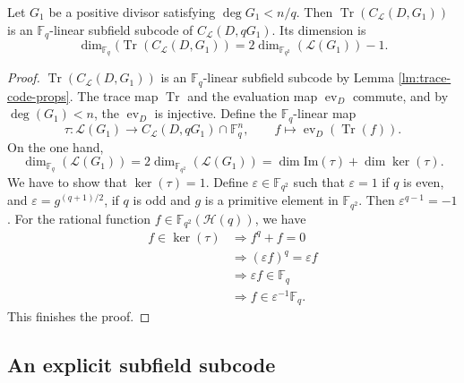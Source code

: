 \documentclass[entropy,article,submit,pdftex,moreauthors]{Definitions/mdpi}
\DeclareMathOperator{\ev}{ev}
\DeclareMathOperator{\trace}{Tr}
\begin{document}
\begin{Proposition} \label{pr:trace-subcode}
	Let $G_1$ be a positive divisor satisfying $\deg G_1 < n/q$. Then $\trace (C_{\mathcal{L}}(D,G_1))$ is an $\mathbb{F}_q$-linear subfield subcode of $C_{\mathcal{L}}(D,qG_1)$. Its dimension is
	\[ \dim_{\mathbb{F}_q}(\trace (C_{\mathcal{L}}(D,G_1)) = 2\dim_{\mathbb{F}_{q^2}}(\mathscr{L}(G_1))-1. \]
\end{Proposition}
\begin{proof}
$\trace (C_{\mathcal{L}}(D,G_1))$ is an $\mathbb{F}_q$-linear subfield subcode by Lemma \ref{lm:trace-code-props}. The trace map $\trace$ and the evaluation map $\ev_D$ commute, and by $\deg(G_1)<n$, the $\ev_D$ is injective. Define the $\mathbb{F}_q$-linear map
\[\tau:\mathscr{L}(G_1) \to C_{\mathcal{L}}(D,qG_1) \cap  \mathbb{F}_q^n, \qquad f\mapsto \ev_D(\trace(f)).\]
On the one hand,
\[\dim_{\mathbb{F}_q}(\mathscr{L}(G_1)) = 2\dim_{\mathbb{F}_{q^2}}(\mathscr{L}(G_1)) = \dim \mathrm{Im}(\tau) + \dim \ker(\tau).\]
We have to show that $\ker(\tau)=1$. Define $\varepsilon\in \mathbb{F}_{q^2}$ such that $\varepsilon=1$ if $q$ is even, and $\varepsilon=g^{(q+1)/2}$, if $q$ is odd and $g$ is a primitive element in $\mathbb{F}_{q^2}$. Then $\varepsilon^{q-1}=-1$. For the rational function $f\in \mathbb{F}_{q^2}(\mathscr{H}(q))$, we have
\begin{align*}
f\in \ker(\tau) &\Rightarrow f^q+f=0 \\
&\Rightarrow (\varepsilon f)^q=\varepsilon f \\
&\Rightarrow \varepsilon f\in \mathbb{F}_q \\
&\Rightarrow f\in \varepsilon^{-1}\mathbb{F}_q.
\end{align*}
This finishes the proof. 
\end{proof}

\subsection{An explicit subfield subcode}
\end{document}

